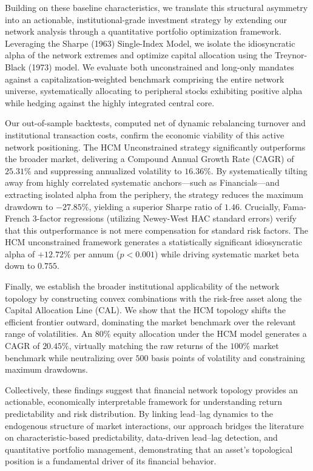 \documentclass[fleqn]{rbfin}
\begin{document}
Building on these baseline characteristics, we translate this structural asymmetry into an actionable, institutional-grade investment strategy by extending our network analysis through a quantitative portfolio optimization framework. Leveraging the Sharpe (1963) Single-Index Model, we isolate the idiosyncratic alpha of the network extremes and optimize capital allocation using the Treynor-Black (1973) model. We evaluate both unconstrained and long-only mandates against a capitalization-weighted benchmark comprising the entire network universe, systematically allocating to peripheral stocks exhibiting positive alpha while hedging against the highly integrated central core.

Our out-of-sample backtests, computed net of dynamic rebalancing turnover and institutional transaction costs, confirm the economic viability of this active network positioning. The HCM Unconstrained strategy significantly outperforms the broader market, delivering a Compound Annual Growth Rate (CAGR) of $25.31\%$ and suppressing annualized volatility to $16.36\%$. By systematically tilting away from highly correlated systematic anchors---such as Financials---and extracting isolated alpha from the periphery, the strategy reduces the maximum drawdown to $-27.85\%$, yielding a superior Sharpe ratio of $1.46$. Crucially, Fama-French 3-factor regressions (utilizing Newey-West HAC standard errors) verify that this outperformance is not mere compensation for standard risk factors. The HCM unconstrained framework generates a statistically significant idiosyncratic alpha of $+12.72\%$ per annum ($p < 0.001$) while driving systematic market beta down to $0.755$.

Finally, we establish the broader institutional applicability of the network topology by constructing convex combinations with the risk-free asset along the Capital Allocation Line (CAL). We show that the HCM topology shifts the efficient frontier outward, dominating the market benchmark over the relevant range of volatilities. An $80\%$ equity allocation under the HCM model generates a CAGR of $20.45\%$, virtually matching the raw returns of the $100\%$ market benchmark while neutralizing over $500$ basis points of volatility and constraining maximum drawdowns. 

Collectively, these findings suggest that financial network topology provides an actionable, economically interpretable framework for understanding return predictability and risk distribution. By linking lead--lag dynamics to the endogenous structure of market interactions, our approach bridges the literature on characteristic-based predictability, data-driven lead--lag detection, and quantitative portfolio management, demonstrating that an asset's topological position is a fundamental driver of its financial behavior.
\end{document}
